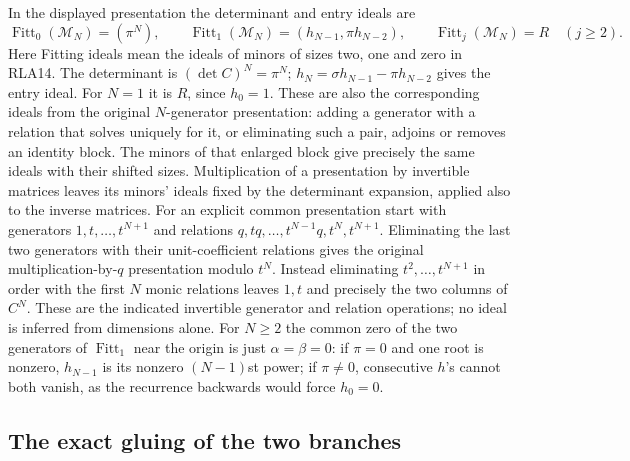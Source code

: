 In the displayed presentation the determinant and entry ideals are
\[
 \operatorname{Fitt}_0(\mathcal M_N)=(\pi^N),\qquad
 \operatorname{Fitt}_1(\mathcal M_N)
   =(h_{N-1},\pi h_{N-2}),\qquad
 \operatorname{Fitt}_j(\mathcal M_N)=R\quad(j\ge2).
 \tag{RLA15}
\]
Here Fitting ideals mean the ideals of minors of sizes two, one
and zero in RLA14.  The determinant is $(\det C)^N=\pi^N$;
$h_N=\sigma h_{N-1}-\pi h_{N-2}$ gives the entry ideal.
For $N=1$ it is $R$, since $h_0=1$.
These are also the corresponding ideals from the original
$N$-generator presentation: adding a generator with a relation that
solves uniquely for it, or eliminating such a pair, adjoins or removes
an identity block.  The minors of that enlarged block give precisely
the same ideals with their shifted sizes.  Multiplication of a
presentation by invertible matrices leaves its minors' ideals fixed
by the determinant expansion, applied also to the inverse matrices.
For an explicit common presentation start with generators
$1,t,\ldots,t^{N+1}$ and relations
$q,tq,\ldots,t^{N-1}q,t^N,t^{N+1}$.
Eliminating the last two generators with their unit-coefficient
relations gives the original multiplication-by-$q$ presentation
modulo $t^N$.  Instead eliminating $t^2,\ldots,t^{N+1}$ in order
with the first $N$ monic relations leaves $1,t$ and precisely the
two columns of $C^N$.  These are the indicated invertible
generator and relation operations; no ideal is inferred from
dimensions alone.
For $N\ge2$ the common zero of the two generators of
$\operatorname{Fitt}_1$ near the origin is just $\alpha=\beta=0$:
if $\pi=0$ and one root is nonzero, $h_{N-1}$ is its nonzero
$(N-1)$st power; if $\pi\ne0$, consecutive $h$'s cannot both vanish,
as the recurrence backwards would force $h_0=0$.

\subsection{The exact gluing of the two branches}

